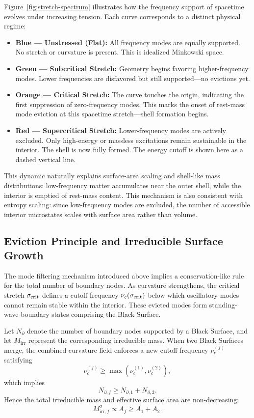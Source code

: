 \documentclass[12pt]{article}
\begin{document}
\newpage
Figure~\ref{fig:stretch-spectrum} illustrates how the frequency support of spacetime evolves under increasing tension. Each curve corresponds to a distinct physical regime:
\begin{itemize}
\item \textbf{Blue --- Unstressed (Flat):} All frequency modes are equally supported. No stretch or curvature is present. This is idealized Minkowski space.

\item \textbf{Green --- Subcritical Stretch:} Geometry begins favoring higher-frequency modes. Lower frequencies are disfavored but still supported---no evictions yet.

\item \textbf{Orange --- Critical Stretch:} The curve touches the origin, indicating the first suppression of zero-frequency modes. This marks the onset of rest-mass mode eviction at this spacetime stretch---shell formation begins.

\item \textbf{Red --- Supercritical Stretch:} Lower-frequency modes are actively excluded. Only high-energy or massless excitations remain sustainable in the interior. The shell is now fully formed.  The energy cutoff is shown here as a dashed vertical line.
\end{itemize}

This dynamic naturally explains surface-area scaling and shell-like mass distributions: low-frequency matter accumulates near the outer shell, while the interior is emptied of rest-mass content.  This mechanism is also consistent with entropy scaling: since low-frequency modes are excluded, the number of accessible interior microstates scales with surface area rather than volume.

\subsection{Eviction Principle and Irreducible Surface Growth}

The mode filtering mechanism introduced above implies a conservation-like rule for the total number of boundary nodes.  As curvature strengthens, the critical stretch \(\sigma_{\rm crit}\) defines a cutoff frequency \(\nu_c(\sigma_{\rm crit})\) below which oscillatory modes cannot remain stable within the interior.  These evicted modes form standing-wave boundary states comprising the Black Surface.

\begin{lemma}
Let \(N_{\partial}\) denote the number of boundary nodes supported by a Black Surface, and let \(M_{\mathrm{irr}}\) represent the corresponding irreducible mass.  When two Black Surfaces merge, the combined curvature field enforces a new cutoff frequency \(\nu_c^{(f)}\) satisfying
\[
\nu_c^{(f)} \ge \max(\nu_{c}^{(1)}, \nu_{c}^{(2)}),
\]
which implies
\[
N_{\partial,f} \ge N_{\partial,1} + N_{\partial,2}.
\]
Hence the total irreducible mass and effective surface area are non-decreasing:
\[
M_{\mathrm{irr},f}^2 \propto A_f \ge A_1 + A_2.
\]
\end{lemma}
\end{document}
